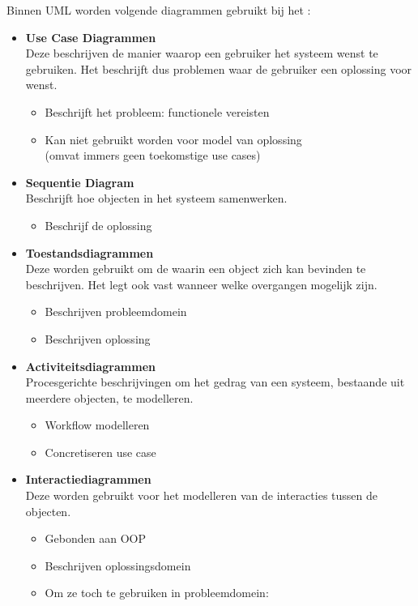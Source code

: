 \documentclass[../../main.tex]{subfiles}
\begin{document}
Binnen UML worden volgende diagrammen gebruikt bij het :
\begin{itemize}

	\item \textbf{Use Case Diagrammen} \\ Deze beschrijven de manier waarop een gebruiker het systeem wenst te gebruiken. Het beschrijft dus problemen waar de gebruiker een oplossing voor wenst.
	\begin{itemize}
		\item Beschrijft het probleem: functionele vereisten
		\item Kan niet gebruikt worden voor model van oplossing \\ (omvat immers geen toekomstige use cases)
	\end{itemize}
	\item \textbf{Sequentie Diagram} \\ Beschrijft hoe objecten in het systeem samenwerken.
	\begin{itemize}
		\item Beschrijf de oplossing
	\end{itemize}
	\item \textbf{Toestandsdiagrammen} \\ Deze worden gebruikt om de  waarin een object zich kan bevinden te beschrijven. Het legt ook vast wanneer welke overgangen mogelijk zijn.
	\begin{itemize}
		\item Beschrijven probleemdomein
		\item Beschrijven oplossing
	\end{itemize}
	\item \textbf{Activiteitsdiagrammen} \\ Procesgerichte beschrijvingen om het gedrag van een systeem, bestaande uit meerdere objecten, te modelleren.
	\begin{itemize}
		\item Workflow modelleren
		\item Concretiseren use case
	\end{itemize}
	\item \textbf{Interactiediagrammen} \\ Deze worden gebruikt voor het modelleren van de interacties tussen de objecten.
	\begin{itemize}
		\item Gebonden aan OOP
		\item Beschrijven oplossingsdomein
		\item Om ze toch te gebruiken in probleemdomein: 
	\end{itemize}
\end{itemize}
\end{document}
